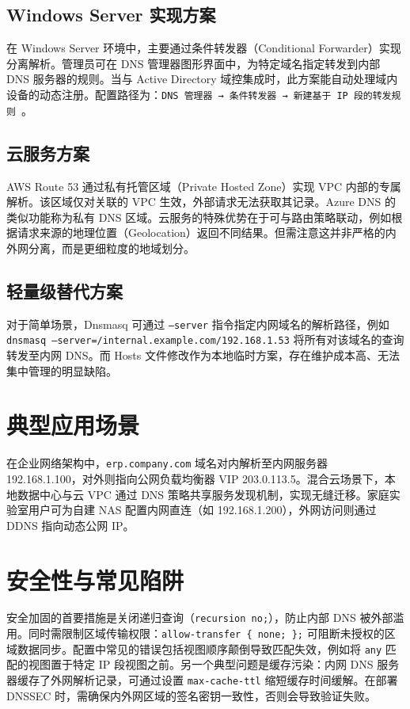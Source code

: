 \section{Windows Server 实现方案}
在 Windows Server 环境中，主要通过条件转发器（Conditional Forwarder）实现分离解析。管理员可在 DNS 管理器图形界面中，为特定域名指定转发到内部 DNS 服务器的规则。当与 Active Directory 域控集成时，此方案能自动处理域内设备的动态注册。配置路径为：\texttt{DNS 管理器 → 条件转发器 → 新建基于 IP 段的转发规则 }。\par
\section{云服务方案}
AWS Route 53 通过私有托管区域（Private Hosted Zone）实现 VPC 内部的专属解析。该区域仅对关联的 VPC 生效，外部请求无法获取其记录。Azure DNS 的类似功能称为私有 DNS 区域。云服务的特殊优势在于可与路由策略联动，例如根据请求来源的地理位置（Geolocation）返回不同结果。但需注意这并非严格的内外网分离，而是更细粒度的地域划分。\par
\section{轻量级替代方案}
对于简单场景，Dnsmasq 可通过 \texttt{--server} 指令指定内网域名的解析路径，例如 \texttt{dnsmasq --server=/internal.example.com/192.168.1.53} 将所有对该域名的查询转发至内网 DNS。而 Hosts 文件修改作为本地临时方案，存在维护成本高、无法集中管理的明显缺陷。\par
\chapter{典型应用场景}
在企业网络架构中，\texttt{erp.company.com} 域名对内解析至内网服务器 192.168.1.100，对外则指向公网负载均衡器 VIP 203.0.113.5。混合云场景下，本地数据中心与云 VPC 通过 DNS 策略共享服务发现机制，实现无缝迁移。家庭实验室用户可为自建 NAS 配置内网直连（如 192.168.1.200），外网访问则通过 DDNS 指向动态公网 IP。\par
\chapter{安全性与常见陷阱}
安全加固的首要措施是关闭递归查询（\texttt{recursion no;}），防止内部 DNS 被外部滥用。同时需限制区域传输权限：\texttt{allow-transfer \{{} none; \}{};} 可阻断未授权的区域数据同步。配置中常见的错误包括视图顺序颠倒导致匹配失效，例如将 \texttt{any} 匹配的视图置于特定 IP 段视图之前。另一个典型问题是缓存污染：内网 DNS 服务器缓存了外网解析记录，可通过设置 \texttt{max-cache-ttl} 缩短缓存时间缓解。在部署 DNSSEC 时，需确保内外网区域的签名密钥一致性，否则会导致验证失败。\par
